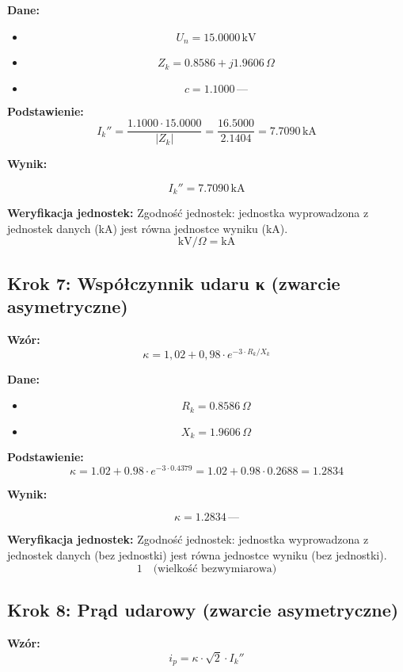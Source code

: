 \documentclass[11pt,a4paper]{article}
\begin{document}
\textbf{Dane:}
\begin{itemize}
  \item
$$
U_n = 15.0000\,\mathrm{kV}
$$
  \item
$$
Z_k = 0.8586 + j1.9606\,\Omega
$$
  \item
$$
c = 1.1000\,\text{—}
$$
\end{itemize}

\textbf{Podstawienie:}
$$
I_k'' = \frac{1.1000 \cdot 15.0000}{|Z_k|} = \frac{16.5000}{2.1404} = 7.7090\,\text{kA}
$$

\textbf{Wynik:}
\begin{center}
$$
I_k'' = 7.7090\,\mathrm{kA}
$$
\end{center}

\textbf{Weryfikacja jednostek:} Zgodność jednostek: jednostka wyprowadzona z jednostek danych (kA) jest równa jednostce wyniku (kA).
$$
\mathrm{kV}/\Omega = \mathrm{kA}
$$

\subsection{Krok 7: Współczynnik udaru κ (zwarcie asymetryczne)}

\textbf{Wzór:}
$$
\kappa = 1{,}02 + 0{,}98 \cdot e^{-3 \cdot R_k / X_k}
$$

\textbf{Dane:}
\begin{itemize}
  \item
$$
R_k = 0.8586\,\Omega
$$
  \item
$$
X_k = 1.9606\,\Omega
$$
\end{itemize}

\textbf{Podstawienie:}
$$
\kappa = 1.02 + 0.98 \cdot e^{-3 \cdot 0.4379} = 1.02 + 0.98 \cdot 0.2688 = 1.2834
$$

\textbf{Wynik:}
\begin{center}
$$
\kappa = 1.2834\,\text{—}
$$
\end{center}

\textbf{Weryfikacja jednostek:} Zgodność jednostek: jednostka wyprowadzona z jednostek danych (bez jednostki) jest równa jednostce wyniku (bez jednostki).
$$
1 \quad \text{(wielkość bezwymiarowa)}
$$

\subsection{Krok 8: Prąd udarowy (zwarcie asymetryczne)}

\textbf{Wzór:}
$$
i_p = \kappa \cdot \sqrt{2} \cdot I_k''
$$
\end{document}
